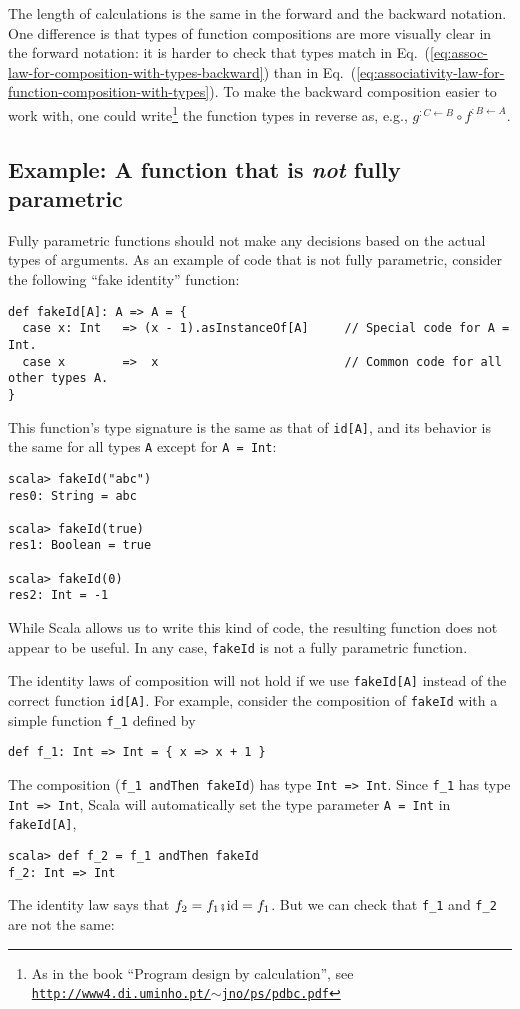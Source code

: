 The length of calculations is the same in the forward and the backward
notation. One difference is that types of function compositions are
more visually clear in the forward notation: it is harder to check
that types match in Eq.~(\ref{eq:assoc-law-for-composition-with-types-backward})
than in Eq.~(\ref{eq:associativity-law-for-function-composition-with-types}).
To make the backward composition easier to work with, one could write\footnote{As in the book \textsf{``}Program design by calculation\textsf{''}, see \texttt{\href{http://www4.di.uminho.pt/~jno/ps/pdbc.pdf}{http://www4.di.uminho.pt/$\sim$jno/ps/pdbc.pdf}}}
the function types in reverse as, e.g., $g^{:C\leftarrow B}\circ f^{:B\leftarrow A}$.

\subsection{Example: A function that is \emph{not} fully parametric}

Fully parametric functions should not make any decisions based on
the actual types of arguments. As an example of code that is not fully
parametric, consider the following \textsf{``}fake identity\textsf{''} function:
\begin{lstlisting}
def fakeId[A]: A => A = {
  case x: Int   => (x - 1).asInstanceOf[A]     // Special code for A = Int.
  case x        =>  x                          // Common code for all other types A.
}
\end{lstlisting}
This function\textsf{'}s type signature is the same as that of \lstinline!id[A]!,
and its behavior is the same for all types \lstinline!A! except for
\lstinline!A = Int!:
\begin{lstlisting}
scala> fakeId("abc")
res0: String = abc

scala> fakeId(true)
res1: Boolean = true

scala> fakeId(0)
res2: Int = -1
\end{lstlisting}
While Scala allows us to write this kind of code, the resulting function
does not appear to be useful. In any case, \lstinline!fakeId! is
not a fully parametric function.

The identity laws of composition will not hold if we use \lstinline!fakeId[A]!
instead of the correct function \lstinline!id[A]!. For example, consider
the composition of \lstinline!fakeId! with a simple function \lstinline!f_1!
defined by
\begin{lstlisting}
def f_1: Int => Int = { x => x + 1 }
\end{lstlisting}
The composition (\lstinline!f_1 andThen fakeId!) has type \lstinline!Int => Int!.
Since \lstinline!f_1! has type \lstinline!Int => Int!, Scala will
automatically set the type parameter \lstinline!A = Int! in \lstinline!fakeId[A]!,
\begin{lstlisting}
scala> def f_2 = f_1 andThen fakeId
f_2: Int => Int
\end{lstlisting}
The identity law says that $f_{2}=f_{1}\bef\text{id}=f_{1}$. But
we can check that \lstinline!f_1! and \lstinline!f_2! are not the
same:

